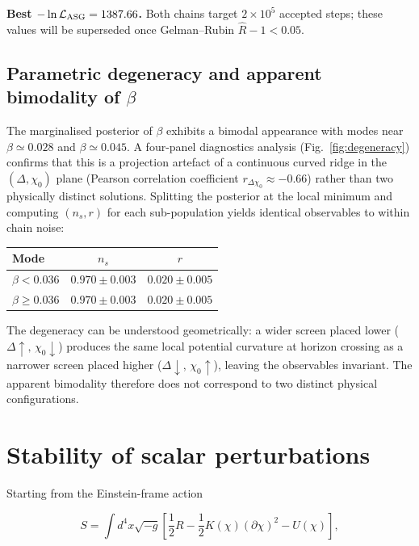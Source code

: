 \documentclass[
]{article}
\begin{document}
\textbf{Best \(-\ln\mathcal{L}_{\rm ASG} = 1387.66\).}
Both chains target \(2\times10^5\) accepted steps; these values will be
superseded once Gelman--Rubin \(\hat{R}-1 < 0.05\).

\subsection{Parametric degeneracy and apparent bimodality of
\texorpdfstring{\(\beta\)}{beta}}\label{beta-bimodality}

The marginalised posterior of \(\beta\) exhibits a bimodal appearance
with modes near \(\beta \simeq 0.028\) and \(\beta \simeq 0.045\).
A four-panel diagnostics analysis (Fig.~\ref{fig:degeneracy}) confirms
that this is a projection artefact of a continuous curved ridge in the
\((\Delta,\chi_{0})\) plane (Pearson correlation coefficient
\(r_{\Delta\chi_{0}} \approx -0.66\)) rather than two physically
distinct solutions. Splitting the posterior at the local minimum and
computing \((n_{s},r)\) for each sub-population yields identical
observables to within chain noise:

\begin{longtable}[]{@{}lcc@{}}
\toprule\noalign{}
Mode & \(n_{s}\) & \(r\) \\
\midrule\noalign{}
\endhead
\bottomrule\noalign{}
\endlastfoot
\(\beta < 0.036\) & \(0.970 \pm 0.003\) & \(0.020 \pm 0.005\) \\
\(\beta \geq 0.036\) & \(0.970 \pm 0.003\) & \(0.020 \pm 0.005\) \\
\end{longtable}

The degeneracy can be understood geometrically: a wider screen placed
lower (\(\Delta\uparrow,\,\chi_{0}\downarrow\)) produces the same
local potential curvature at horizon crossing as a narrower screen
placed higher (\(\Delta\downarrow,\,\chi_{0}\uparrow\)), leaving
the observables invariant. The apparent bimodality therefore does not
correspond to two distinct physical configurations.


\section{Stability of scalar
perturbations}\label{stability-of-scalar-perturbations}

Starting from the Einstein-frame action

\[
S = \int d^{4}x\sqrt{- g}\left\lbrack \frac{1}{2}R - \frac{1}{2}K(\chi)(\partial\chi)^{2} - U(\chi) \right\rbrack,
\]
\end{document}
